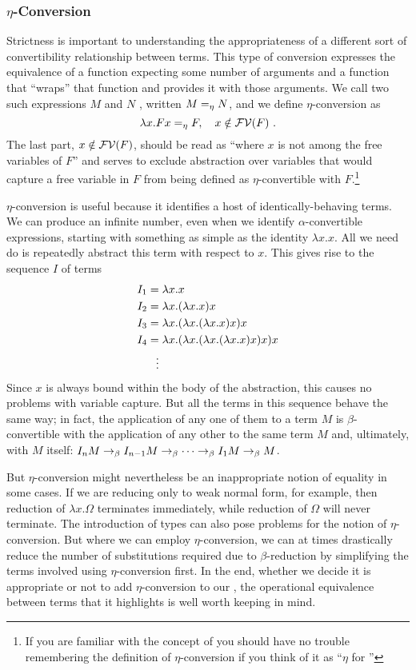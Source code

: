 \subsubsection{\texorpdfstring{$\eta$-Conversion}{Eta-Conversion}}\label{untyped:eta}
Strictness is important to understanding the appropriateness of a different sort of convertibility relationship between terms. This type of conversion expresses the equivalence of a function expecting some number of arguments and a function that ``wraps'' that function and provides it with those arguments. We call two such expressions $M$ and $N$ , written $M =_{\eta} N$, and we define $\eta$-conversion as
\[
\lambda x. F x =_{\eta} F,\quad x \notin \mathcal{FV}(F)\text{ .}
\]
The last part, $x \notin \mathcal{FV}(F)$, should be read as ``where $x$ is not among the free variables of $F$'' and serves to exclude abstraction over variables that would capture a free variable in $F$ from being defined as $\eta$-convertible with $F$.\footnote{If you are familiar with the concept of  you should have no trouble remembering the definition of $\eta$-conversion if you think of it as ``$\eta$ for ''}

$\eta$-conversion is useful because it identifies a host of identically-behaving terms. We can produce an infinite number, even when we identify $\alpha$-convertible expressions, starting with something as simple as the identity $\lambda x. x$. All we need do is repeatedly abstract this term with respect to $x$. This gives rise to the sequence $I$ of terms 
\begin{align*}
I_{1} &= \lambda x.x\\
I_{2} &= \lambda x . (\lambda x.x) x\\
I_{3} &= \lambda x . (\lambda x . (\lambda x.x) x) x\\
I_{4} &= \lambda x . (\lambda x . (\lambda x . (\lambda x.x) x) x) x\\
&\hphantom{=}\vdots
\end{align*}
Since $x$ is always bound within the body of the abstraction, this causes no problems with variable capture. But all the terms in this sequence behave the same way; in fact, the application of any one of them to a term $M$ is $\beta$-convertible with the application of any other to the same term $M$ and, ultimately, with $M$ itself: $I_{n} M \betared I_{n-1} M \betared \dotsb \betared I_{1} M \betared M$.

But $\eta$-conversion might nevertheless be an inappropriate notion of equality in some cases. If we are reducing only to weak normal form, for example, then reduction of $\lambda x . \Omega$ terminates immediately, while reduction of $\Omega$ will never terminate. The introduction of types can also pose problems for the notion of $\eta$-conversion. But where we can employ $\eta$-conversion, we can at times drastically reduce the number of substitutions required due to $\beta$-reduction by simplifying the terms involved using $\eta$-conversion first. In the end, whether we decide it is appropriate or not to add $\eta$-conversion to our \lambdacalc{}, the operational equivalence between terms that it highlights is well worth keeping in mind.